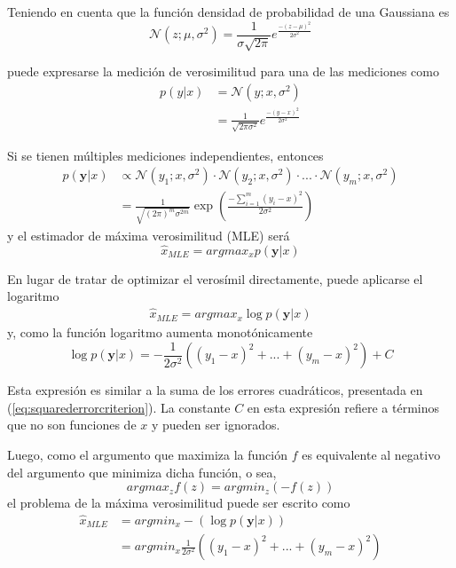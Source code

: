 Teniendo en cuenta que la función densidad de probabilidad de una Gaussiana es
\begin{equation}
    \mathcal{N}(z;\mu,\sigma^2) = \frac{1}{\sigma \sqrt{2\pi}} e^{\frac{-(z-\mu)^2}{2\sigma^2}}
\end{equation}

puede expresarse la medición de verosimilitud para una de las mediciones como
\begin{align}
    p(y|x) &= \mathscr{N}(y;x,\sigma^2) \\
           &= \frac{1}{\sqrt{2\pi\sigma^2}} e^{\frac{-(y-x)^2}{2\sigma^2}}
\end{align}

Si se tienen múltiples mediciones independientes, entonces
\begin{align}
    p(\bm{y}|x) &\propto \mathscr{N}(y_1;x,\sigma^2)\cdot\mathscr{N}(y_2;x,\sigma^2)\cdot...\cdot\mathscr{N}(y_m;x,\sigma^2) \\
            &= \frac{1}{\sqrt{(2\pi)^m\sigma^{2m}}} \exp\left({\frac{-\sum_{i=1}^m(y_i-x)^2}{2\sigma^2}}\right)
\end{align}
y el estimador de máxima verosimilitud (MLE) será
\begin{equation}
    \hat{x}_{MLE} = argmax_x p(\bm{y}|x)
\end{equation}

En lugar de tratar de optimizar el verosímil directamente, puede aplicarse el logaritmo
\begin{align}
    \hat{x}_{MLE} = argmax_x \log p(\bm{y}|x)
    \label{eq:mlewithlog}
\end{align}
y, como la función logaritmo aumenta monotónicamente
\begin{equation}
    \log p(\bm{y}|x) = -\frac{1}{2\sigma^2}\left((y_1-x)^2+...+(y_m-x)^2\right)+C
\end{equation}

Esta expresión es similar a la suma de los errores cuadráticos, presentada en (\ref{eq:squarederrorcriterion}). La constante $C$ en esta expresión refiere a términos que no son funciones de $x$ y pueden ser ignorados.

Luego, como el argumento que maximiza la función $f$ es equivalente al negativo del argumento que minimiza dicha función, o sea,
\begin{equation}
    argmax_z f(z) = argmin_z \left(-f(z)\right)
\end{equation}
el problema de la máxima verosimilitud puede ser escrito como
\begin{align}
    \hat{x}_{MLE} &= argmin_x -\left(\log p(\bm{y}|x)\right) \\
                  &= argmin_x \frac{1}{2\sigma^2}\left((y_1-x)^2+...+(y_m-x)^2\right)
\end{align}

